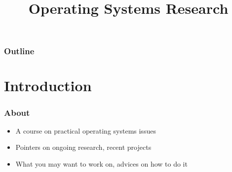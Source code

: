 %
%
%
%
%
%

%
%

%
%

\def\path{../../..}

%
%



%
%

\title{Operating Systems Research}

%
%



%
%

\begin{frame}
  \titlepage
\end{frame}

%
%

\begin{frame}
  \frametitle{Outline}

  \tableofcontents
\end{frame}

%
%

\section{Introduction}

\begin{frame}
 \frametitle{About}

 \begin{itemize}
   \item
     A course on practical operating systems issues
   \item
     Pointers on ongoing research, recent projects
   \item
     What you may want to work on, advices on how to do it
 \end{itemize}
\end{frame}

